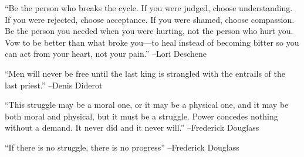 \documentclass{article}%
\begin{document}
\begin{minipage}{\textwidth}%
\flushleft%
“Be the person who breaks the cycle. If you were judged, choose understanding. If you were rejected, choose acceptance. If you were shamed, choose compassion. Be the person you needed when you were hurting, not the person who hurt you. Vow to be better than what broke you—to heal instead of becoming bitter so you can act from your heart, not your pain.”%
\linebreak%
\vspace{1mm}%
–Lori Deschene%
\linebreak%
\vspace{1mm}%
\end{minipage}%
\linebreak%
\vspace{1mm}%
\begin{minipage}{\textwidth}%
\flushleft%
“Men will never be free until the last king is strangled with the entrails of the last priest.”%
\linebreak%
\vspace{1mm}%
–Denis Diderot%
\linebreak%
\vspace{1mm}%
\end{minipage}%
\linebreak%
\vspace{1mm}%
\begin{minipage}{\textwidth}%
\flushleft%
“This struggle may be a moral one, or it may be a physical one, and it may be both moral and physical, but it must be a struggle. Power concedes nothing without a demand. It never did and it never will.”%
\linebreak%
\vspace{1mm}%
–Frederick Douglass%
\linebreak%
\vspace{1mm}%
\end{minipage}%
\linebreak%
\vspace{1mm}%
\begin{minipage}{\textwidth}%
\flushleft%
“If there is no struggle, there is no progress”%
\linebreak%
\vspace{1mm}%
–Frederick Douglass%
\linebreak%
\vspace{1mm}%
\end{minipage}%
\linebreak%
\vspace{1mm}%
\end{document}
